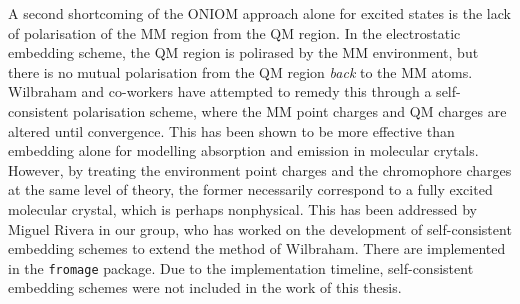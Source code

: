 A second shortcoming of the ONIOM approach alone for excited states is the lack of polarisation of the MM region from the QM region. In the electrostatic embedding scheme, the QM region is polirased by the MM environment, but there is no mutual polarisation from the QM region \textit{back} to the MM atoms. Wilbraham and co-workers have attempted to remedy this through a self-consistent polarisation scheme, where the MM point charges and QM charges are altered until convergence.\cite{Wilbraham2016} This has been shown to be more effective than embedding alone for modelling absorption and emission in molecular crytals.\cite{Presti2017a,Wilbraham2018a} However, by treating the environment point charges and the chromophore charges at the same level of theory, the former necessarily correspond to a fully excited molecular crystal, which is perhaps nonphysical. This has been addressed by Miguel Rivera in our group, who has worked on the development of self-consistent embedding schemes to extend the method of Wilbraham. There are implemented in the \texttt{fromage} package. Due to the implementation timeline, self-consistent embedding schemes were not included in the work of this thesis. 
